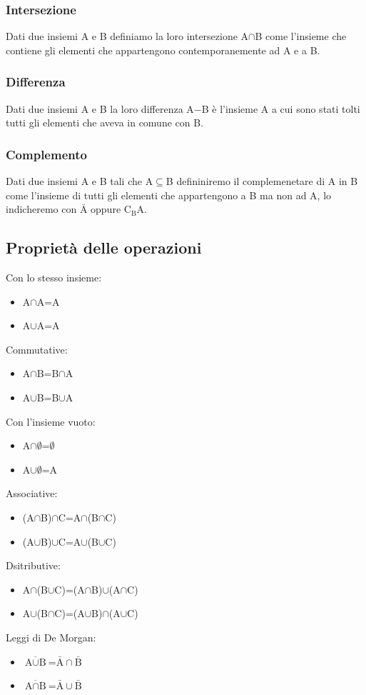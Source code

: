\documentclass[../main.tex]{subfiles}
\begin{document}
    \subsubsection{Intersezione}
    Dati due insiemi A e B definiamo la loro intersezione A$\cap$B come l'insieme che contiene gli elementi che appartengono contemporanemente ad A e a B.

    \subsubsection{Differenza}
    Dati due insiemi A e B la loro differenza A$-$B è l'insieme A a cui sono stati tolti tutti gli elementi che aveva in comune con B.

    \subsubsection{Complemento}
    Dati due insiemi A e B tali che A$\subseteq$B defininiremo il complemenetare di A in B come l'insieme di tutti gli elementi che appartengono a B ma non ad A, lo indicheremo con $\bar{\text{A}}$ oppure $\text{C}_{\text{B}}\text{A}$.

    \subsection{Proprietà delle operazioni}
    Con lo stesso insieme:
    \begin{itemize}
        \item A$\cap$A=A
        \item A$\cup$A=A
    \end{itemize}
    Commutative:
    \begin{itemize}
        \item A$\cap$B=B$\cap$A
        \item A$\cup$B=B$\cup$A
    \end{itemize}
    Con l'insieme vuoto:
    \begin{itemize}
        \item A$\cap \emptyset$=$\emptyset$
        \item A$\cup \emptyset$=A
    \end{itemize}
    Associative:
    \begin{itemize}
        \item (A$\cap$B)$\cap$C=A$\cap$(B$\cap$C)
        \item (A$\cup$B)$\cup$C=A$\cup$(B$\cup$C)
    \end{itemize}
    Dsitributive:
    \begin{itemize}
        \item A$\cap$(B$\cup$C)=(A$\cap$B)$\cup$(A$\cap$C)
        \item A$\cup$(B$\cap$C)=(A$\cup$B)$\cap$(A$\cup$C)
    \end{itemize}
    Leggi di De Morgan:
    \begin{itemize}
        \item $\overline{\text{A} \cup \text{B}}$=$\bar{\text{A}} \cap \bar{\text{B}}$
        \item $\overline{\text{A} \cap \text{B}}$=$\bar{\text{A}} \cup \bar{\text{B}}$
    \end{itemize}
\end{document}
